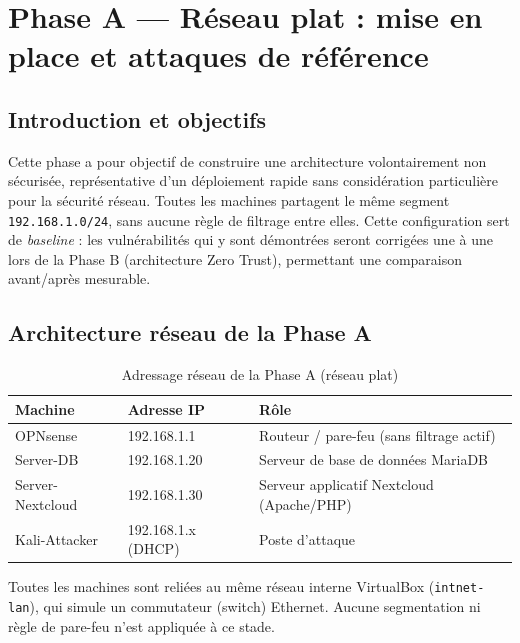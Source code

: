 
\chapter{Phase A --- Réseau plat : mise en place et attaques de référence}

\section{Introduction et objectifs}

Cette phase a pour objectif de construire une architecture volontairement
non sécurisée, représentative d'un déploiement rapide sans considération
particulière pour la sécurité réseau. Toutes les machines partagent le
même segment \texttt{192.168.1.0/24}, sans aucune règle de filtrage entre
elles. Cette configuration sert de \emph{baseline} : les vulnérabilités
qui y sont démontrées seront corrigées une à une lors de la Phase B
(architecture Zero Trust), permettant une comparaison avant/après
mesurable.

\section{Architecture réseau de la Phase A}

\begin{table}[h]
\centering
\begin{tabular}{|l|l|l|}
\hline
\textbf{Machine} & \textbf{Adresse IP} & \textbf{Rôle} \\
\hline
OPNsense & 192.168.1.1 & Routeur / pare-feu (sans filtrage actif) \\
Server-DB & 192.168.1.20 & Serveur de base de données MariaDB \\
Server-Nextcloud & 192.168.1.30 & Serveur applicatif Nextcloud (Apache/PHP) \\
Kali-Attacker & 192.168.1.x (DHCP) & Poste d'attaque \\
\hline
\end{tabular}
\caption{Adressage réseau de la Phase A (réseau plat)}
\label{tab:adressage-phase-a}
\end{table}

Toutes les machines sont reliées au même réseau interne VirtualBox
(\texttt{intnet-lan}), qui simule un commutateur (switch) Ethernet.
Aucune segmentation ni règle de pare-feu n'est appliquée à ce stade.

